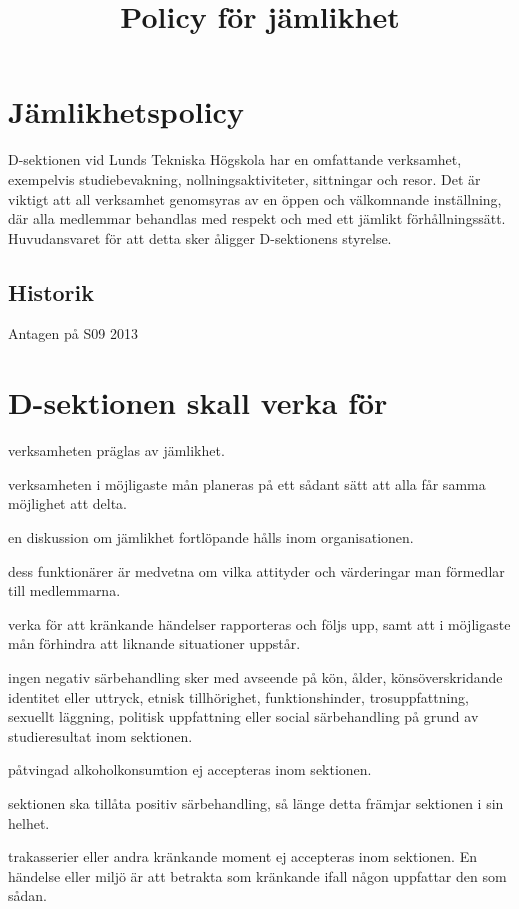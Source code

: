 \documentclass{dsekkallelse}
\title{Policy för jämlikhet}
\author{}
\begin{document}
\section{Jämlikhetspolicy}
D-sektionen vid Lunds Tekniska Högskola har en omfattande verksamhet, exempelvis studiebevakning, nollningsaktiviteter, sittningar och resor. Det är viktigt att all verksamhet
genomsyras av en öppen och välkomnande inställning, där alla medlemmar behandlas med
respekt och med ett jämlikt förhållningssätt. Huvudansvaret för att detta sker åligger D-sektionens styrelse.

\subsection{Historik}
Antagen på S09 2013

\section{D-sektionen skall verka för}



\begin{attlista}
	\item verksamheten präglas av jämlikhet.
	\item verksamheten i möjligaste mån planeras på ett sådant sätt att alla får samma möjlighet att delta. 
	\item en diskussion om jämlikhet fortlöpande hålls inom organisationen.
	\item dess funktionärer är medvetna om vilka attityder och värderingar man förmedlar till
medlemmarna.
\item verka för att kränkande händelser rapporteras och följs upp, samt att i möjligaste mån
förhindra att liknande situationer uppstår.
\item ingen negativ särbehandling sker med avseende på kön, ålder, könsöverskridande identitet eller uttryck, etnisk tillhörighet, funktionshinder, trosuppfattning, sexuellt läggning,
politisk uppfattning eller social särbehandling på grund av studieresultat inom sektionen.
\item påtvingad alkoholkonsumtion ej accepteras inom sektionen.
\item sektionen ska tillåta positiv särbehandling, så länge detta främjar sektionen i sin helhet.
\item trakasserier eller andra kränkande moment ej accepteras inom sektionen. En händelse
eller miljö är att betrakta som kränkande ifall någon uppfattar den som sådan.
\end{attlista}
\end{document}
